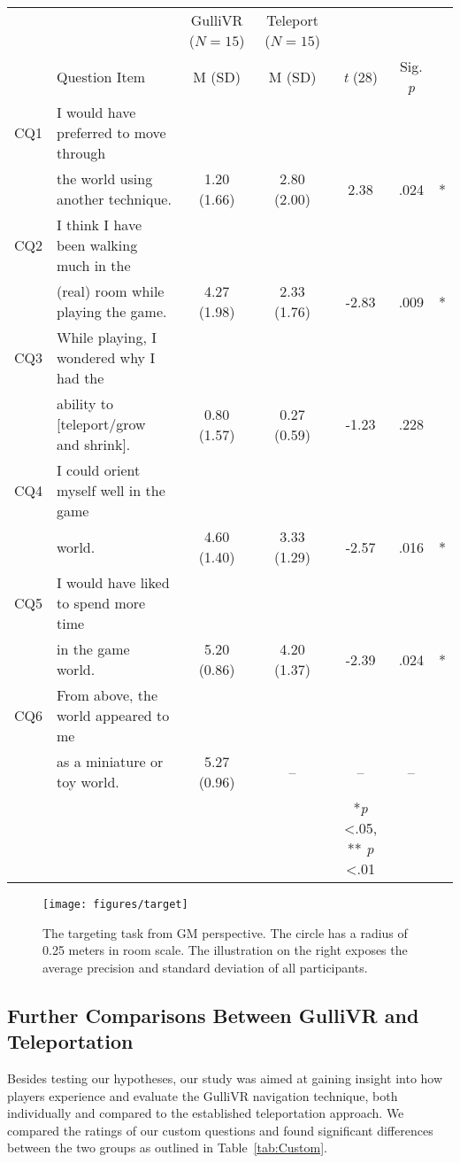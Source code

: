 \documentclass{sigchi}
\begin{document}
\begin{table*}[]
\caption{Mean scores and standard deviations of the custom questions (CQ) and independent samples t-test values of comparison.}
  \label{tab:Custom}
  \begin{tabular}{llccccl}
    \toprule
     && GulliVR ($N = 15$) & Teleport ($N = 15$) &  &  &\\
     &Question Item & M (SD)	& M (SD) & \textit{t} (28) & Sig. \textit{p} & \\
    \midrule
    CQ1 & I would have preferred to move through\\ 
    &the world using another technique. & 1.20 (1.66) & 2.80 (2.00) & 2.38 & .024 &*\\\addlinespace 
    CQ2& I think I have been walking much in the \\ 
    &(real) room while playing the game. & 4.27 (1.98) & 2.33 (1.76) & -2.83 & .009 &*\\\addlinespace 
    CQ3& While playing, I wondered why I had the \\
    &ability to [teleport/grow and shrink]. & 0.80 (1.57) & 0.27 (0.59) & -1.23 & .228 &\\\addlinespace 
    CQ4& I could orient myself well in the game\\& world. & 4.60 (1.40) & 3.33 (1.29) & -2.57 & .016 & *\\ \addlinespace 
    CQ5& I would have liked to spend more time\\&in the game world. & 5.20 (0.86) & 4.20 (1.37) & -2.39& .024 &*\\ \addlinespace 
        CQ6& From above, the world appeared to me\\& as a miniature or toy world. & 5.27 (0.96) & -- & --& -- &\\
  \bottomrule
  &&&&*\textit{p} <.05, ** \textit{p} <.01
\end{tabular}
\end{table*}

\begin{figure}[!b]
\centering
\texttt{[image: figures/target]}
\caption{The targeting task from GM perspective. The circle has a radius of 0.25 meters in room scale. The illustration on the right exposes the average precision and standard deviation of all participants. }
\label{fig:target}
\end{figure}


\subsection{Further Comparisons Between GulliVR and Teleportation}
Besides testing our hypotheses, our study was aimed at gaining insight into how players experience and evaluate the GulliVR navigation technique, both individually and compared to the established teleportation approach. We compared the ratings of our custom questions and found significant differences between the two groups as outlined in Table~\ref{tab:Custom}.
\end{document}
